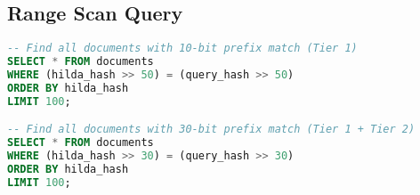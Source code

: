 \documentclass[11pt]{article}
\begin{document}
\subsection{Range Scan Query}

\begin{lstlisting}[language=SQL, caption=sCIDR Range Scan]
-- Find all documents with 10-bit prefix match (Tier 1)
SELECT * FROM documents
WHERE (hilda_hash >> 50) = (query_hash >> 50)
ORDER BY hilda_hash
LIMIT 100;

-- Find all documents with 30-bit prefix match (Tier 1 + Tier 2)
SELECT * FROM documents  
WHERE (hilda_hash >> 30) = (query_hash >> 30)
ORDER BY hilda_hash
LIMIT 100;
\end{lstlisting}
\end{document}
